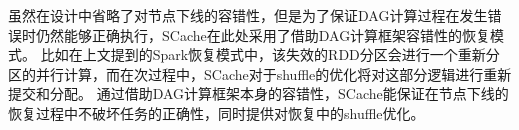 虽然在设计中省略了对节点下线的容错性，但是为了保证DAG计算过程在发生错误时仍然能够正确执行，SCache在此处采用了借助DAG计算框架容错性的恢复模式。
比如在上文提到的Spark恢复模式中，该失效的RDD分区会进行一个重新分区的并行计算，而在次过程中，SCache对于shuffle的优化将对这部分逻辑进行重新提交和分配。
通过借助DAG计算框架本身的容错性，SCache能保证在节点下线的恢复过程中不破坏任务的正确性，同时提供对恢复中的shuffle优化。


